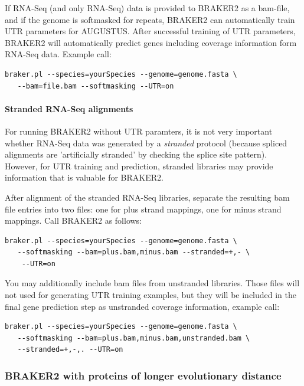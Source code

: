 \documentclass[]{article}
\let\oldparagraph\paragraph
\renewcommand{\paragraph}[1]{\oldparagraph{#1}\mbox{}}
\begin{document}
If RNA-Seq (and only RNA-Seq) data is provided to BRAKER2 as a bam-file,
and if the genome is softmasked for repeats, BRAKER2 can automatically
train UTR parameters for AUGUSTUS. After successful training of UTR
parameters, BRAKER2 will automatically predict genes including coverage
information form RNA-Seq data. Example call:

\begin{verbatim}
braker.pl --species=yourSpecies --genome=genome.fasta \
   --bam=file.bam --softmasking --UTR=on
\end{verbatim}

\paragraph{Stranded RNA-Seq
alignments}\label{stranded-rna-seq-alignments}

For running BRAKER2 without UTR paramters, it is not very important
whether RNA-Seq data was generated by a \emph{stranded} protocol
(because spliced alignments are 'artificially stranded' by checking the
splice site pattern). However, for UTR training and prediction, stranded
libraries may provide information that is valuable for BRAKER2.

After alignment of the stranded RNA-Seq libraries, separate the
resulting bam file entries into two files: one for plus strand mappings,
one for minus strand mappings. Call BRAKER2 as follows:

\begin{verbatim}
braker.pl --species=yourSpecies --genome=genome.fasta \
   --softmasking --bam=plus.bam,minus.bam --stranded=+,- \
    --UTR=on
\end{verbatim}

You may additionally include bam files from unstranded libraries. Those
files will not used for generating UTR training examples, but they will
be included in the final gene prediction step as unstranded coverage
information, example call:

\begin{verbatim}
braker.pl --species=yourSpecies --genome=genome.fasta \
   --softmasking --bam=plus.bam,minus.bam,unstranded.bam \
   --stranded=+,-,. --UTR=on
\end{verbatim}

\hypertarget{braker2-with-proteins-of-longer-evolutionary-distance}{\subsubsection{BRAKER2
with proteins of longer evolutionary
distance}\label{braker2-with-proteins-of-longer-evolutionary-distance}}
\end{document}
